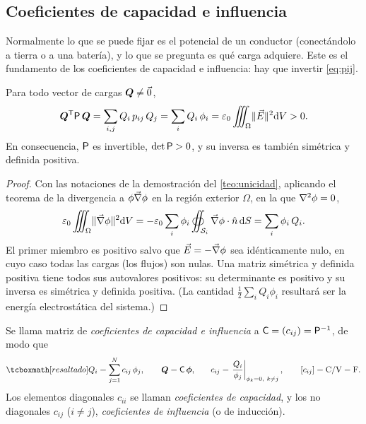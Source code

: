 \subsection{Coeficientes de capacidad e influencia}\label{sec:cij}
Normalmente lo que se puede fijar es el potencial de un conductor (conectándolo a tierra o a una batería), y lo que se pregunta es qué carga adquiere.
Este es el fundamento de los coeficientes de capacidad e influencia: hay que invertir \cref{eq:pij}.

\begin{lema}\label{lem:definida}
Para todo vector de cargas $\bm{Q}\neq\vec{0}$,
\begin{equation}\label{eq:definida}
  \bm{Q}^{\mathsf{T}}\mathsf{P}\,\bm{Q}=\sum_{i,j}Q_i\,p_{ij}\,Q_j=\sum_iQ_i\,\phi_i=\varepsilon_{0}\iiint_{\Omega}\lVert \vec{E}\rVert^{2}\mathrm{d} V>0 .
\end{equation}
En consecuencia, $\mathsf{P}$ es invertible, $\det\mathsf{P}>0$, y su inversa es también simétrica y definida positiva.
\end{lema}
\begin{proof}
Con las notaciones de la demostración del \cref{teo:unicidad}, aplicando el teorema de la divergencia a $\phi\vec{\nabla}\phi$ en la región exterior $\Omega$,
en la que $\nabla^{2}\phi=0$,
\[
  \varepsilon_{0}\iiint_{\Omega}\lVert \vec{\nabla}\phi\rVert^{2}\mathrm{d} V=-\varepsilon_{0}\sum_i\phi_i\oiint_{\mathcal{S}_i}\vec{\nabla}\phi\cdot\hat{n}\,\mathrm{d} S=\sum_i\phi_i\,Q_i .
\]
El primer miembro es positivo salvo que $\vec{E}=-\vec{\nabla}\phi$ sea idénticamente nulo, en cuyo caso todas las cargas (los flujos) son nulas. Una matriz simétrica
y definida positiva tiene todos sus autovalores positivos: su determinante es positivo y su inversa es simétrica y definida positiva. (La cantidad
$\tfrac12\sum_iQ_i\phi_i$ resultará ser la energía electrostática del sistema.)
\end{proof}

\begin{definicion}\label{def:cij}
Se llama matriz de \emph{coeficientes de capacidad e influencia} a $\mathsf{C}=(c_{ij})=\mathsf{P}^{-1}$, de modo que
\begin{equation}\label{eq:cij}
  \resalta{Q_i=\sum_{j=1}^{N}c_{ij}\,\phi_j,\qquad\vQ=\Cm\,\vphi,}\qquad
  c_{ij}=\left.\frac{Q_i}{\phi_j}\right|_{\phi_k=0,\ k\neq j},\qquad[c_{ij}]=\mathrm{C/V}=\mathrm{F}.
\end{equation}
Los elementos diagonales $c_{ii}$ se llaman \emph{coeficientes de capacidad}, y los no diagonales $c_{ij}$ ($i\neq j$), \emph{coeficientes de influencia}
(o de inducción).
\end{definicion}

